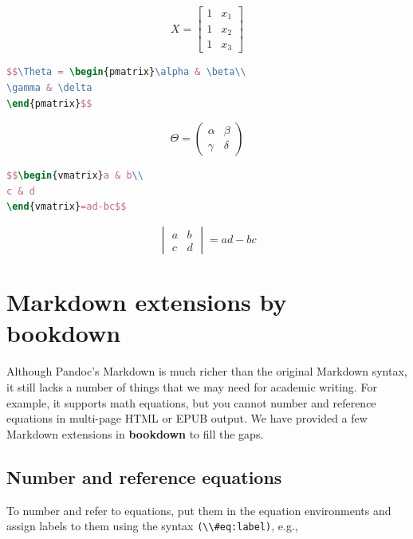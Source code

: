 \documentclass[doctor,openright,twoside]{sjtuthesis}
\newcommand{\passthrough}[1]{#1}
\theoremstyle{plain}
\theoremstyle{definition}
\theoremstyle{remark}
\theoremstyle{ocrenumbox}
\theoremstyle{plain}
\begin{document}
\[X = \begin{bmatrix}1 & x_{1}\\
1 & x_{2}\\
1 & x_{3}
\end{bmatrix}\]

\begin{lstlisting}[language=TeX]
$$\Theta = \begin{pmatrix}\alpha & \beta\\
\gamma & \delta
\end{pmatrix}$$
\end{lstlisting}

\[\Theta = \begin{pmatrix}\alpha & \beta\\
\gamma & \delta
\end{pmatrix}\]

\begin{lstlisting}[language=TeX]
$$\begin{vmatrix}a & b\\
c & d
\end{vmatrix}=ad-bc$$
\end{lstlisting}

\[\begin{vmatrix}a & b\\
c & d
\end{vmatrix}=ad-bc\]

\hypertarget{markdown-extensions-by-bookdown}{%
\section{Markdown extensions by
bookdown}\label{markdown-extensions-by-bookdown}}

Although Pandoc's Markdown is much richer than the original Markdown
syntax, it still lacks a number of things that we may need for academic
writing. For example, it supports math equations, but you cannot number
and reference equations in multi-page HTML or EPUB output. We have
provided a few Markdown extensions in \textbf{bookdown} to fill the
gaps.

\hypertarget{equations}{%
\subsection{Number and reference equations}\label{equations}}

To number and refer to equations,
put them in the equation environments and assign labels to them using
the syntax \passthrough{\lstinline!(\\#eq:label)!}, e.g.,
\end{document}
